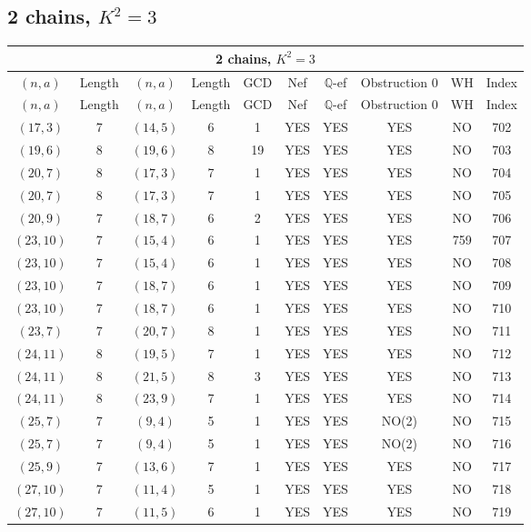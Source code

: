 \subsection{2 chains, $K^2 = 3$}
\begin{longtable}{|c|c|c|c|c|c|c|c|c|c|}
\hline
\multicolumn{10}{|c|}{2 chains, $K^2 = 3$}\\
\hline
$(n,a)$ & Length & $(n,a)$ & Length & GCD & Nef & $\mathbb Q$-ef & Obstruction 0 & WH & Index\\
\hline
\endfirsthead

\hline
$(n,a)$ & Length & $(n,a)$ & Length & GCD & Nef & $\mathbb Q$-ef & Obstruction 0 & WH & Index\\
\hline
\endhead
\hline
\endfoot

$(17, 3)$ & 7 & $(14, 5)$ & 6 & 1 & YES & YES & YES & NO & 702\\
$(19, 6)$ & 8 & $(19, 6)$ & 8 & 19 & YES & YES & YES & NO & 703\\
$(20, 7)$ & 8 & $(17, 3)$ & 7 & 1 & YES & YES & YES & NO & 704\\
$(20, 7)$ & 8 & $(17, 3)$ & 7 & 1 & YES & YES & YES & NO & 705\\
$(20, 9)$ & 7 & $(18, 7)$ & 6 & 2 & YES & YES & YES & NO & 706\\
$(23, 10)$ & 7 & $(15, 4)$ & 6 & 1 & YES & YES & YES & 759 & 707\\
$(23, 10)$ & 7 & $(15, 4)$ & 6 & 1 & YES & YES & YES & NO & 708\\
$(23, 10)$ & 7 & $(18, 7)$ & 6 & 1 & YES & YES & YES & NO & 709\\
$(23, 10)$ & 7 & $(18, 7)$ & 6 & 1 & YES & YES & YES & NO & 710\\
$(23, 7)$ & 7 & $(20, 7)$ & 8 & 1 & YES & YES & YES & NO & 711\\
$(24, 11)$ & 8 & $(19, 5)$ & 7 & 1 & YES & YES & YES & NO & 712\\
$(24, 11)$ & 8 & $(21, 5)$ & 8 & 3 & YES & YES & YES & NO & 713\\
$(24, 11)$ & 8 & $(23, 9)$ & 7 & 1 & YES & YES & YES & NO & 714\\
$(25, 7)$ & 7 & $(9, 4)$ & 5 & 1 & YES & YES & NO(2) & NO & 715\\
$(25, 7)$ & 7 & $(9, 4)$ & 5 & 1 & YES & YES & NO(2) & NO & 716\\
$(25, 9)$ & 7 & $(13, 6)$ & 7 & 1 & YES & YES & YES & NO & 717\\
$(27, 10)$ & 7 & $(11, 4)$ & 5 & 1 & YES & YES & YES & NO & 718\\
$(27, 10)$ & 7 & $(11, 5)$ & 6 & 1 & YES & YES & YES & NO & 719\\

\end{longtable}
